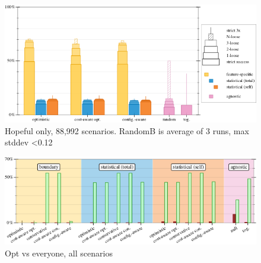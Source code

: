 \begin{figure}[t]
  \includegraphics[width=0.8\columnwidth]{data/strategy-overall-hopeful.pdf}
  \caption{Hopeful only, 88,992 scenarios. RandomB is average of 3 runs, max stddev <0.12}
  \label{f:strategy-hope}
\end{figure}

\begin{figure}[t]
  \includegraphics[width=0.9\columnwidth]{data/head-to-head.pdf}
  \caption{Opt vs everyone, all scenarios}
  \label{f:head-to-head}
\end{figure}

\clearpage

